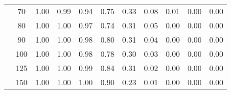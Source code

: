 \begin{table}[t]
\begin{center}
\begin{subtable}[c]{\textwidth}
\begin{center}
\begin{tabular}{rcccccccccc}
                                        & \multicolumn{1}{c|}{70}  & \num{1.00}  & \num{0.99}  & \num{0.94}  & \num{0.75}  & \num{0.33}  & \num{0.08}  & \num{0.01}  & \num{0.00}  & \num{0.00}  \\
                                        & \multicolumn{1}{c|}{80}  & \num{1.00}  & \num{1.00}  & \num{0.97}  & \num{0.74}  & \num{0.31}  & \num{0.05}  & \num{0.00}  & \num{0.00}  & \num{0.00}  \\
                                        & \multicolumn{1}{c|}{90}  & \num{1.00}  & \num{1.00}  & \num{0.98}  & \num{0.80}  & \num{0.31}  & \num{0.04}  & \num{0.00}  & \num{0.00}  & \num{0.00}  \\
                                        & \multicolumn{1}{c|}{100}  & \num{1.00}  & \num{1.00}  & \num{0.98}  & \num{0.78}  & \num{0.30}  & \num{0.03}  & \num{0.00}  & \num{0.00}  & \num{0.00}  \\
                                        & \multicolumn{1}{c|}{125}  & \num{1.00}  & \num{1.00}  & \num{0.99}  & \num{0.84}  & \num{0.31}  & \num{0.02}  & \num{0.00}  & \num{0.00}  & \num{0.00}  \\
                                        & \multicolumn{1}{c|}{150}  & \num{1.00}  & \num{1.00}  & \num{1.00}  & \num{0.90}  & \num{0.23}  & \num{0.01}  & \num{0.00}  & \num{0.00}  & \num{0.00}  \\
                                    \end{tabular}
            \end{center}
        \end{subtable}

        \vspace{5mm}


\end{center}
\end{table}
